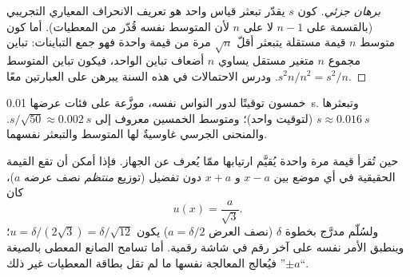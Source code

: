 \begin{proof}[برهان جزئي]
كون $s$ يقدّر تبعثر قياس واحد هو تعريف الانحراف المعياري التجريبي
(بالقسمة على $n - 1$ لا على $n$ لأن المتوسط نفسه قُدّر من المعطيات).
أما كون متوسط $n$ قيمة مستقلة يتبعثر أقلّ $\sqrt n$ مرة من قيمة
واحدة فهو جمع التباينات: تباين مجموع $n$ متغير مستقل يساوي $n$ أضعاف
تباين الواحد، فيكون تباين المتوسط $s^2 n / n^2 = s^2/n$. ودرس
الاحتمالات في هذه السنة يبرهن على العبارتين معًا.
\end{proof}

\begin{omfigure}

{\small خمسون توقيتًا لدور النواس نفسه، موزَّعة على فئات عرضها
\qty{0.01}{s}. وتبعثرها $s \approx \qty{0.016}{s}$ (لتوقيت واحد)؛
ومتوسط الخمسين معروف إلى $s/\sqrt{50} \approx \qty{0.002}{s}$.
والمنحنى الجرسي غاوسيةٌ لها المتوسط والتبعثر نفسهما.}
\end{omfigure}

\begin{proposition}\label{prop:b1:units-dimensions:typeB}
حين تُقرأ قيمة مرة واحدة يُقيَّم ارتيابها ممّا يُعرف عن الجهاز. فإذا
أمكن أن تقع القيمة الحقيقية في أي موضع بين $x - a$ و $x + a$ دون
تفضيل (توزيع \emph{منتظم} نصف عرضه $a$)، كان
\[
u(x) = \frac{a}{\sqrt 3} .
\]
ولسُلّم مدرَّج بخطوة $\delta$ (نصف العرض $a = \delta/2$) يكون
$u = \delta/(2\sqrt3) = \delta/\sqrt{12}$؛ وينطبق الأمر نفسه على آخر
رقم في شاشة رقمية. أما تسامح الصانع المعطى بالصيغة ``$\pm a$''
فيُعالج المعالجة نفسها ما لم تقل بطاقة المعطيات غير ذلك.
\end{proposition}

